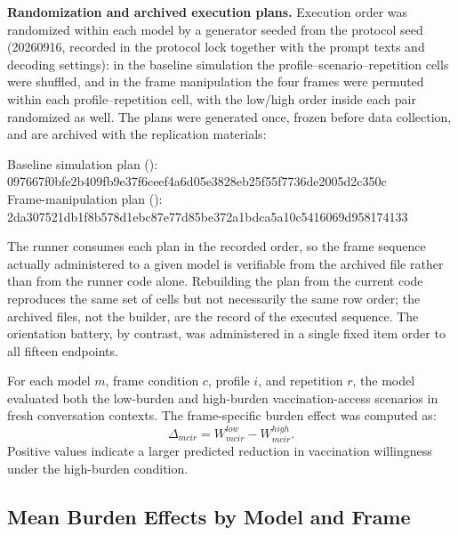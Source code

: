 \textbf{Randomization and archived execution plans.} Execution order was randomized within each model by a generator seeded from the protocol seed (20260916, recorded in the protocol lock together with the prompt texts and decoding settings): in the baseline simulation the profile--scenario--repetition cells were shuffled, and in the frame manipulation the four frames were permuted within each profile--repetition cell, with the low/high order inside each pair randomized as well. The plans were generated once, frozen before data collection, and are archived with the replication materials:
\begin{flushleft}
{\footnotesize Baseline simulation plan ():}\\
{\footnotesize\ttfamily 097667f0bfe2b409fb9e37f6ceef4a6d05e3828eb25f55f7736de2005d2c350c}\\
{\footnotesize Frame-manipulation plan ():}\\
{\footnotesize\ttfamily 2da307521db1f8b578d1ebc87e77d85be372a1bdca5a10c5416069d958174133}
\end{flushleft}
The runner consumes each plan in the recorded order, so the frame sequence actually administered to a given model is verifiable from the archived file rather than from the runner code alone. Rebuilding the plan from the current code reproduces the same set of cells but not necessarily the same row order; the archived files, not the builder, are the record of the executed sequence. The orientation battery, by contrast, was administered in a single fixed item order to all fifteen endpoints.

For each model \(m\), frame condition \(c\), profile \(i\), and repetition \(r\), the model evaluated both the low-burden and high-burden vaccination-access scenarios in fresh conversation contexts. The frame-specific burden effect was computed as:
\[
\Delta_{mcir} = W^{low}_{mcir} - W^{high}_{mcir}.
\]
Positive values indicate a larger predicted reduction in vaccination willingness under the high-burden condition.

\subsection{Mean Burden Effects by Model and Frame}

